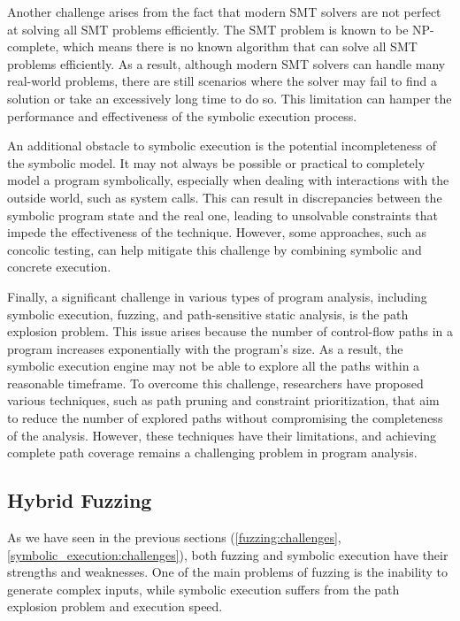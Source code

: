 
Another challenge arises from the fact that modern SMT solvers are not perfect at solving all SMT problems efficiently. The SMT problem is known to be NP-complete, which means there is no known algorithm that can solve all SMT problems efficiently. As a result, although modern SMT solvers can handle many real-world problems, there are still scenarios where the solver may fail to find a solution or take an excessively long time to do so. This limitation can hamper the performance and effectiveness of the symbolic execution process.


An additional obstacle to symbolic execution is the potential incompleteness of the symbolic model. It may not always be possible or practical to completely model a program symbolically, especially when dealing with interactions with the outside world, such as system calls. This can result in discrepancies between the symbolic program state and the real one, leading to unsolvable constraints that impede the effectiveness of the technique. However, some approaches, such as concolic testing, can help mitigate this challenge by combining symbolic and concrete execution.


Finally, a significant challenge in various types of program analysis, including symbolic execution, fuzzing, and path-sensitive static analysis, is the path explosion problem. This issue arises because the number of control-flow paths in a program increases exponentially with the program's size. As a result, the symbolic execution engine may not be able to explore all the paths within a reasonable timeframe. To overcome this challenge, researchers have proposed various techniques, such as path pruning and constraint prioritization, that aim to reduce the number of explored paths without compromising the completeness of the analysis. However, these techniques have their limitations, and achieving complete path coverage remains a challenging problem in program analysis.

\subsection{Hybrid Fuzzing}

As we have seen in the previous sections (\ref{fuzzing:challenges}, \ref{symbolic_execution:challenges}), both fuzzing and symbolic execution have their strengths and weaknesses. One of the main problems of fuzzing is the inability to generate complex inputs, while symbolic execution suffers from the path explosion problem and execution speed.

